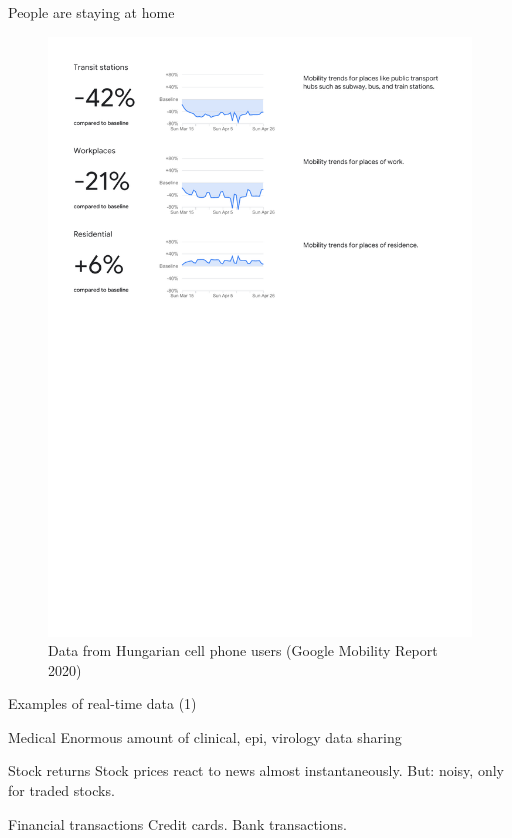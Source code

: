 \documentclass[
  ignorenonframetext,
  aspectratio=54,
]{beamer}
\begin{document}
\begin{frame}{People are staying at home}
\protect\hypertarget{people-are-staying-at-home}{}
\begin{figure}
\centering
\includegraphics[width=1\textwidth,height=\textheight]{exhibit/fig/gmr-home.pdf}
\caption{Data from Hungarian cell phone users (Google Mobility Report
2020)}
\end{figure}
\end{frame}

\begin{frame}{Examples of real-time data (1)}
\protect\hypertarget{examples-of-real-time-data-1}{}
\begin{block}{Medical}
\protect\hypertarget{medical}{}
Enormous amount of clinical, epi, virology data sharing
\end{block}

\begin{block}{Stock returns}
\protect\hypertarget{stock-returns}{}
Stock prices react to news almost instantaneously. But: noisy, only for
traded stocks.
\end{block}

\begin{block}{Financial transactions}
\protect\hypertarget{financial-transactions}{}
Credit cards. Bank transactions.
\end{block}
\end{frame}
\end{document}
